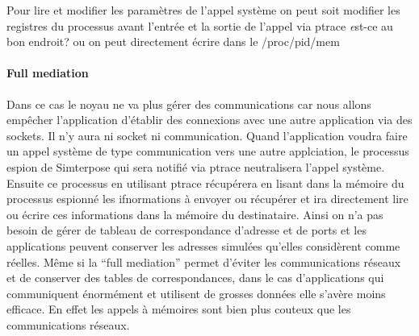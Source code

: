 {\color{green} Pour lire et modifier les paramètres de l'appel système on peut
  soit modifier les registres du processus avant l'entrée et la sortie de
  l'appel via ptrace \textit est-ce au bon endroit?} {\color{red}ou on peut
  directement écrire dans le /proc/pid/mem}
\paragraph{Full mediation} Dans ce cas le noyau ne va plus gérer des communications car nous allons empêcher l'application d'établir des connexions avec une autre application via des sockets. Il n'y aura ni socket ni communication. Quand l'application voudra faire un appel système de type communication vers une autre applciation, le processus espion de Simterpose qui sera notifié via ptrace neutralisera l'appel système. Ensuite ce processus en utilisant ptrace récupérera en lisant dans la mémoire du processus espionné les ifnormations à envoyer ou récupérer et ira directement lire ou écrire ces informations dans la mémoire du destinataire. Ainsi on n'a pas besoin de gérer de tableau de correspondance d'adresse et de ports et les applications peuvent conserver les adresses simulées qu'elles considèrent comme réelles.
Même si la ``full mediation'' permet d'éviter les communications réseaux et de
conserver des tables de correspondances, dans le cas d'applications qui
communiquent énormément et utilisent de grosses données elle s'avère moins
efficace. En effet les appels à mémoires sont bien plus couteux que les
communications réseaux.
